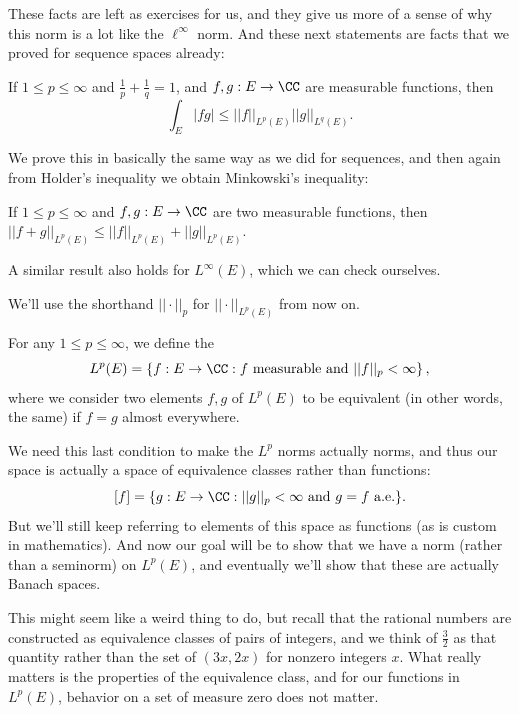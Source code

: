 These facts are left as exercises for us, and they give us more of a sense of why this norm is a lot like the $\ell^{\infty}$ norm. And these next statements are facts that we proved for sequence spaces already:

\begin{theorem}
If $1 \le p \le \infty$ and $\frac{1}{p} + \frac{1}{q} = 1$, and $f, g: E \to \CC$ are measurable functions, then
\[
    \int_E |fg| \le ||f||_{L^p(E)} ||g||_{L^q(E)}.
\]
\end{theorem} 

We prove this in basically the same way as we did for sequences, and then again from Holder's inequality we obtain Minkowski's inequality:

\begin{theorem}
If $1 \le p \le \infty$ and $f, g: E \to \CC$ are two measurable functions, then $||f+g||_{L^p(E)} \le ||f||_{L^p(E)} + ||g||_{L^p(E)}$.
\end{theorem}

A similar result also holds for $L^{\infty}(E)$, which we can check ourselves.

\begin{fact}
We'll use the shorthand $||\cdot||_p$ for $||\cdot||_{L^p(E)}$ from now on.
\end{fact}

\begin{definition}
For any $1 \le p \le \infty$, we define the  
\[
    L^p(E) = \left\{f: E \to \CC: f \text{ measurable and }||f||_p < \infty\right\},
\]
where we consider two elements $f, g$ of $L^p(E)$ to be equivalent (in other words, the same) if $f = g$ almost everywhere.
\end{definition}

We need this last condition to make the $L^p$ norms actually norms, and thus our space is actually a space of equivalence classes rather than functions:
\[
    [f] = \{g: E \to \CC: ||g||_{p} < \infty \text{ and } g = f \text{ a.e.}\}.
\]
But we'll still keep referring to elements of this space as functions (as is custom in mathematics). And now our goal will be to show that we have a norm (rather than a seminorm) on $L^p(E)$, and eventually we'll show that these are actually Banach spaces.

\begin{remark}
This might seem like a weird thing to do, but recall that the rational numbers are constructed as equivalence classes of pairs of integers, and we think of $\frac{3}{2}$ as that quantity rather than the set of $(3x, 2x)$ for nonzero integers $x$. What really matters is the properties of the equivalence class, and for our functions in $L^p(E)$, behavior on a set of measure zero does not matter.
\end{remark}

